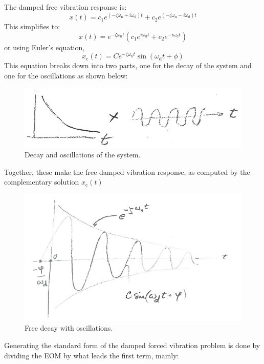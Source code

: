 \documentclass[12pt,letter]{article}
\begin{document}
The damped free vibration response is:
\begin{equation}
	x(t) = c_1 e^{(-\zeta \omega_\text{n} + i \omega_\text{d})t} + c_2 e^{(-\zeta \omega_\text{n} -i \omega_d)t}
\end{equation} 
This simplifies to:
\begin{equation}
	x(t) = e^{-\zeta \omega_\text{n} t} (c_1 e^{i \omega_\text{d}t} + c_2 e^{-i \omega_\text{d}t} )
\end{equation}
or using Euler's equation, 
\begin{equation}
x_\text{c}(t) = C e^{-\zeta \omega_\text{n} t} \sin (\omega_\text{d} t + \phi)
\end{equation}
This equation breaks down into two parts, one for the decay of the system and one for the oscillations as shown below:
\begin{figure}[H]
	\centering
	\includegraphics[width=5in]{../figures/decay_and_oscillations.png}
	\caption{Decay and oscillations of the system.}
\end{figure}
Together, these make the free damped vibration response, as computed by the complementary solution $x_\text{c}(t)$
\begin{figure}[H]
	\centering
	\includegraphics[width=5in]{../figures/free_decay_with_oscillations.png}
	\caption{Free decay with oscillations.}
\end{figure}
Generating the standard form of the damped forced vibration problem is done by dividing the EOM by what leads the first term, mainly:
\end{document}
